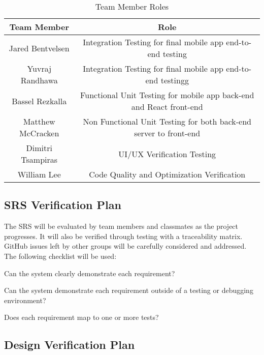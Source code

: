 \documentclass[12pt, titlepage]{article}
\begin{document}
	\begin{table}
		\begin{center}
			\begin{tabular}{ |c|c| } 
				\hline
				\textbf{Team Member} & \textbf{Role} \\
				\hline
				Jared Bentvelsen & Integration Testing for final mobile app end-to-end testing \\
				\hline 
				Yuvraj Randhawa & Integration Testing for final mobile app end-to-end testingg \\
				\hline
				Bassel Rezkalla & Functional Unit Testing for mobile app back-end and React front-end \\
				\hline
				Matthew McCracken & Non Functional Unit Testing for both back-end server to front-end \\
				\hline
				Dimitri Tsampiras & UI/UX Verification Testing \\
				\hline 
				William Lee & Code Quality and Optimization Verification\\
				\hline
			\end{tabular}
			\caption{Team Member Roles}
		\end{center}
	\end{table}
	
	\subsection{SRS Verification Plan}

	The SRS will be evaluated by team members and classmates as the project progresses. It will also be verified through testing with a traceability matrix.
	GitHub issues left by other groups will be carefully considered and addressed.
	The following checklist will be used:
	\begin{todolist}
		\item Can the system clearly demonstrate each requirement?
		\item Can the system demonstrate each requirement outside of a testing or debugging environment?
		\item Does each requirement map to one or more tests?
	\end{todolist}
	
	\subsection{Design Verification Plan}
\end{document}
